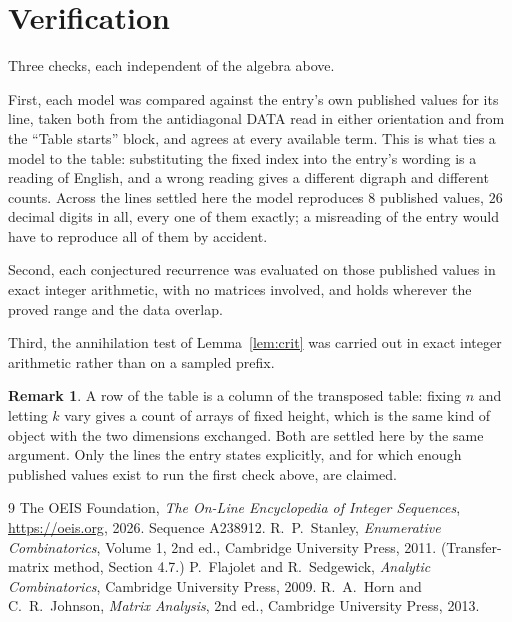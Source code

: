 \documentclass[11pt,a4paper]{article}
\theoremstyle{plain}
\theoremstyle{definition}
\newtheorem{remark}[theorem]{Remark}
\begin{document}
\section{Verification}

Three checks, each independent of the algebra above.

First, each model was compared against the entry's own published values for its line, taken
both from the antidiagonal DATA read in either orientation and from the ``Table starts''
block, and agrees at every available term. This is what ties a model to the table:
substituting the fixed index into the entry's wording is a reading of English, and a wrong
reading gives a different digraph and different counts. Across the lines settled here the
model reproduces $8$ published values, $26$ decimal digits in all, every one of
them exactly; a misreading of the entry would have to reproduce all of them by accident.

Second, each conjectured recurrence was evaluated on those published values in exact
integer arithmetic, with no matrices involved, and holds wherever the proved range and the
data overlap.

Third, the annihilation test of Lemma~\ref{lem:crit} was carried out in exact integer
arithmetic rather than on a sampled prefix.

\begin{remark}
A row of the table is a column of the transposed table: fixing $n$ and letting $k$ vary gives a
count of arrays of fixed height, which is the same kind of object with the two dimensions
exchanged. Both are settled here by the same argument. Only the lines the entry states
explicitly, and for which enough published values exist to run the first check above, are
claimed.
\end{remark}

\begin{thebibliography}{9}
 The OEIS Foundation, \emph{The On-Line Encyclopedia of Integer
Sequences}, \url{https://oeis.org}, 2026. Sequence A238912.
 R.~P.~Stanley, \emph{Enumerative Combinatorics}, Volume 1, 2nd ed.,
Cambridge University Press, 2011. (Transfer-matrix method, Section 4.7.)
 P.~Flajolet and R.~Sedgewick, \emph{Analytic Combinatorics}, Cambridge
University Press, 2009.
 R.~A.~Horn and C.~R.~Johnson, \emph{Matrix Analysis}, 2nd ed., Cambridge
University Press, 2013.
\end{thebibliography}
\end{document}
